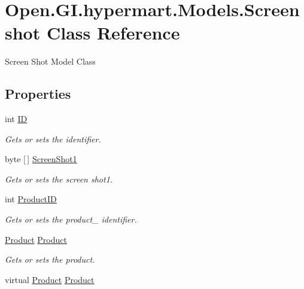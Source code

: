 \hypertarget{class_open_1_1_g_i_1_1hypermart_1_1_models_1_1_screenshot}{}\section{Open.\+G\+I.\+hypermart.\+Models.\+Screenshot Class Reference}
\label{class_open_1_1_g_i_1_1hypermart_1_1_models_1_1_screenshot}


Screen Shot Model Class  


\subsection*{Properties}
\begin{DoxyCompactItemize}
\item 
int \hyperlink{class_open_1_1_g_i_1_1hypermart_1_1_models_1_1_screenshot_a7460fabffe75a362966595c8b86cdef2}{ID}
\begin{DoxyCompactList}\small\item\em Gets or sets the identifier. \end{DoxyCompactList}\item 
byte \mbox{[}$\,$\mbox{]} \hyperlink{class_open_1_1_g_i_1_1hypermart_1_1_models_1_1_screenshot_a435ca1863d66de2de497d603585610d8}{Screen\+Shot1}
\begin{DoxyCompactList}\small\item\em Gets or sets the screen shot1. \end{DoxyCompactList}\item 
int \hyperlink{class_open_1_1_g_i_1_1hypermart_1_1_models_1_1_screenshot_ad381abf51bb0ebb1c2566c70df11c05a}{Product\+ID}
\begin{DoxyCompactList}\small\item\em Gets or sets the product\+\_\+ identifier. \end{DoxyCompactList}\item 
\hyperlink{class_open_1_1_g_i_1_1hypermart_1_1_models_1_1_product}{Product} \hyperlink{class_open_1_1_g_i_1_1hypermart_1_1_models_1_1_screenshot_ae4e4b60e07136a6c4debe888426d6f6b}{Product}
\begin{DoxyCompactList}\small\item\em Gets or sets the product. \end{DoxyCompactList}\item 
virtual \hyperlink{class_open_1_1_g_i_1_1hypermart_1_1_models_1_1_product}{Product} \hyperlink{class_open_1_1_g_i_1_1hypermart_1_1_models_1_1_screenshot_a8aed1d2289db7caefe8c7e14e0f5cc50}{Product}
\end{DoxyCompactItemize}


